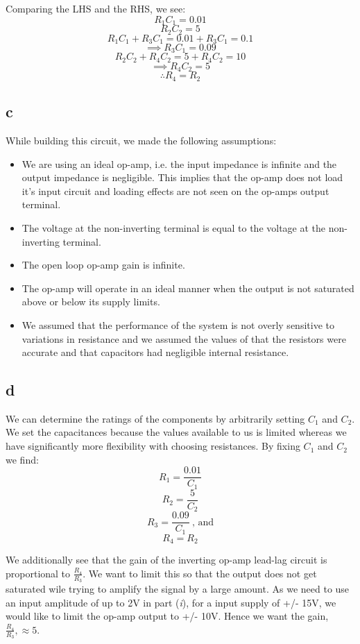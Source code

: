 \documentclass{article}
\theoremstyle{plain}
\theoremstyle{definition}
\theoremstyle{remark}
\begin{document}
Comparing the LHS and the RHS, we see:
$$R_1C_1 = 0.01$$
$$R_2C_2 = 5$$
$$R_1C_1 + R_3C_1 = 0.01 + R_3C_1 = 0.1$$
$$\implies R_3C_1 = 0.09$$
$$R_2C_2 + R_4C_2 = 5 + R_4C_2 = 10$$
$$\implies R_4C_2 = 5$$
$$\therefore R_4 = R_2$$

\subsection*{c}
While building this circuit, we made the following assumptions:
\begin{itemize}
\item We are using an ideal op-amp, i.e. the input impedance is infinite and the output impedance is negligible. This implies that the op-amp does not load it's input circuit and loading effects are not seen on the op-amps output terminal.

\item The voltage at the non-inverting terminal is equal to the voltage at the non-inverting terminal.

\item The open loop op-amp gain is infinite.

\item The op-amp will operate in an ideal manner when the output is not saturated above or below its supply limits.

\item We assumed that the performance of the system is not overly sensitive to variations in resistance and we assumed the values of that the resistors were accurate and that capacitors had negligible internal resistance.

\end{itemize}

\subsection*{d}
We can determine the ratings of the components by arbitrarily setting $C_1$ and $C_2$. We set the capacitances because the values available to us is limited whereas we have significantly more flexibility with choosing resistances. By fixing $C_1$ and $C_2$ we find:
$$R_1 = \frac{0.01}{C_1}$$
$$R_2 = \frac{5}{C_2}$$
$$R_3 = \frac{0.09}{C_1} \ \text{,  and}$$
$$R_4 = R_2$$

We additionally see that the gain of the inverting op-amp lead-lag circuit is proportional to $ \frac{R_4}{R_3}$. We  want to limit this so that the output does not get saturated wile trying to amplify the signal by a large amount. As we need to use an input amplitude of up to 2V in part (\emph{i}), for a input supply of +/- 15V, we would like to limit the op-amp output to +/- 10V. Hence we want the gain,$ \frac{R_4}{R_3}, \approx 5$. 
\end{document}

